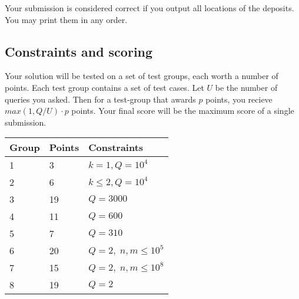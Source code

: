 Your submission is considered correct if you output all locations of the deposits. You may print them in any order.

\subsection*{Constraints and scoring}
Your solution will be tested on a set of test groups, each worth a number of points.
Each test group contains a set of test cases.
Let $U$ be the number of queries you asked. Then for a test-group that awards $p$ points, you recieve $max(1,Q/U)\cdot p$ points.
Your final score will be the maximum score of a single submission.

\medskip
\begin{tabular}{lll}
Group & Points & Constraints \\\hline
1 & 3   & $k = 1, Q = 10^4$\\
2 & 6   & $k \le 2, Q = 10^4$\\
3 & 19  & $Q = 3000$\\
4 & 11  & $Q = 600$\\
5 & 7   & $Q = 310$\\
6 & 20  & $Q = 2,\; n,m \le 10^5$\\
7 & 15  & $Q = 2,\; n,m \le 10^8$\\
8 & 19  & $Q = 2$
\end{tabular}

